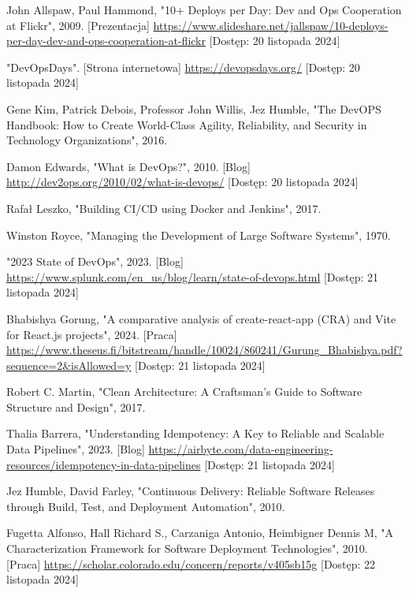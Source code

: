 \documentclass{article}
\begin{document}
\begin{thebibliography}{9}

John Allspaw, Paul Hammond, "10+ Deploys per Day: Dev and Ops Cooperation at Flickr", 2009. [Prezentacja] \url{https://www.slideshare.net/jallspaw/10-deploys-per-day-dev-and-ops-cooperation-at-flickr} [Dostęp: 20 listopada 2024]

"DevOpsDays". [Strona internetowa] \url{https://devopsdays.org/} [Dostęp: 20 listopada 2024]

Gene Kim, Patrick Debois, Professor John Willis, Jez Humble, "The DevOPS Handbook: How to Create World-Class Agility, Reliability, and Security in Technology Organizations", 2016.

Damon Edwards, "What is DevOps?", 2010. [Blog] \url{http://dev2ops.org/2010/02/what-is-devops/} [Dostęp: 20 listopada 2024]

Rafał Leszko, "Building CI/CD using Docker and Jenkins", 2017.

Winston Royce, "Managing the Development of Large Software Systems", 1970.

"2023 State of DevOps", 2023. [Blog] \url{https://www.splunk.com/en_us/blog/learn/state-of-devops.html} [Dostęp: 21 listopada 2024]

Bhabishya Gorung, "A comparative analysis of create-react-app (CRA) and Vite for React.js projects", 2024. [Praca] \url{https://www.theseus.fi/bitstream/handle/10024/860241/Gurung_Bhabishya.pdf?sequence=2&isAllowed=y} [Dostęp: 21 listopada 2024]

Robert C. Martin, "Clean Architecture: A Craftsman's Guide to Software Structure and Design", 2017.

Thalia Barrera, "Understanding Idempotency: A Key to Reliable and Scalable Data Pipelines", 2023. [Blog] \url{https://airbyte.com/data-engineering-resources/idempotency-in-data-pipelines} [Dostęp: 21 listopada 2024]

Jez Humble, David Farley, "Continuous Delivery: Reliable Software Releases through Build, Test, and Deployment Automation", 2010.

Fugetta Alfonso, Hall Richard S., Carzaniga Antonio, Heimbigner Dennis M, "A Characterization Framework for Software Deployment Technologies", 2010. [Praca] \url{https://scholar.colorado.edu/concern/reports/v405sb15g} [Dostęp: 22 listopada 2024]


\end{thebibliography}
\end{document}
